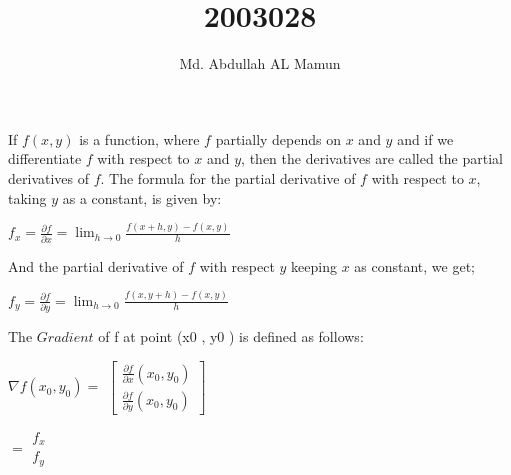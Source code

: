 \documentclass{book}
\title{2003028}
\author{Md. Abdullah AL Mamun}
\begin{document}
\setlength{\topmargin}{5cm}
\setlength{\rightmargin}{5cm}
\setlength{\leftmargin}{5cm}

\maketitle

If $f(x,y)$ is a function, where $f$ partially depends on $x$ and $y$ and if we differentiate $f$ with respect to $x$ and $y$, then the derivatives are called the partial derivatives of $f$. The formula for the partial derivative of $f$ with respect to $x$, taking $y$ as a constant, is given by:

\begin{center}
    $f_x =  \frac{\partial f}{\partial x} = \lim_{h \to 0} \frac{f(x+h,y)-f(x,y)}{h}$
\end{center}

And the partial derivative of $f$ with respect $y$ keeping $x$ as constant, we get;

\begin{center}
    $f_y =  \frac{\partial f}{\partial y} = \lim_{h \to 0} \frac{f(x,y+h)-f(x,y)}{h}$
\end{center}

The $Gradient$ of f at point (x0 , y0 ) is deﬁned as follows:

\begin{center}
    $\nabla f(x_0,y_0) =$
    $\begin{bmatrix}
            \frac{\partial f}{\partial x}(x_0,y_0) \\
            \frac{\partial f}{\partial y}(x_0,y_0)
        \end{bmatrix}$
\end{center}
\begin{center}
    $=
        \begin{matrix}
            f_x \\
            f_y
        \end{matrix}$
\end{center}
\end{document}
